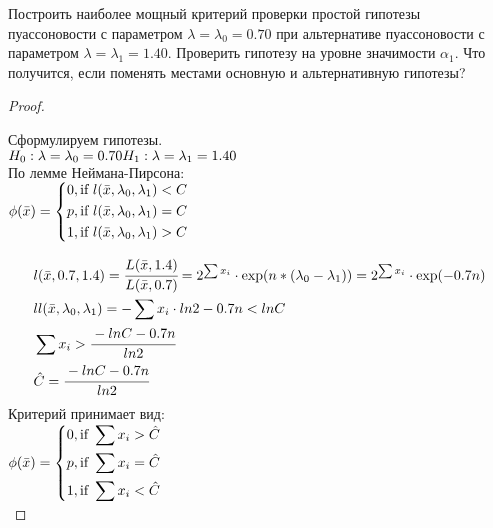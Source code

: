 \begin{problem}
	Построить наиболее мощный критерий проверки простой гипотезы пуассоновости с параметром $\lambda=\lambda_0=0.70$ при альтернативе пуассоновости с параметром $\lambda=\lambda_1=1.40$. Проверить гипотезу на уровне значимости $\alpha_1$. Что получится, если поменять местами основную и альтернативную гипотезы?
\end{problem}

\begin{proof}
	$ $
	
	Сформулируем гипотезы. \\
	$H_0:\lambda=\lambda_0=0.70 \\ H_1:\lambda=\lambda_1=1.40$ \\
	По лемме Неймана-Пирсона: \\
		
	$\phi(\bar x)=\left\{
	\begin{gathered}
		0, \text{if } l(\bar x, \lambda_0, \lambda_1)<C \hfill \\
		p, \text{if } l(\bar x, \lambda_0, \lambda_1)=C \hfill \\
		1, \text{if } l(\bar x, \lambda_0, \lambda_1)>C \hfill \\ 
	\end{gathered}
	\right.$
	
	\begin{align}
		& l(\bar x, 0.7, 1.4)=\cfrac{L(\bar x, 1.4)}{L(\bar x, 0.7)}=2^{\sum x_i}\cdot \exp(n*(\lambda_0-\lambda_1))=2^{\sum x_i}\cdot \exp(-0.7n) \\
		& ll(\bar x, \lambda_0, \lambda_1)=-\sum x_i\cdot ln2-0.7n<lnC \\ 
		& \sum x_i > \cfrac{-lnC-0.7n}{ln2} \\
		& \hat{C}=\cfrac{-lnC-0.7n}{ln2} \\
	\end{align}
	Критерий принимает вид: \\
	
	$\phi(\bar x)=\left\{
	\begin{gathered}
		0, \text{if } \sum x_i>\hat{C} \hfill \\
		p, \text{if } \sum x_i=\hat{C} \hfill \\
		1, \text{if } \sum x_i<\hat{C} \hfill \\ 
	\end{gathered}
	\right.$	\\
	

\end{proof}
